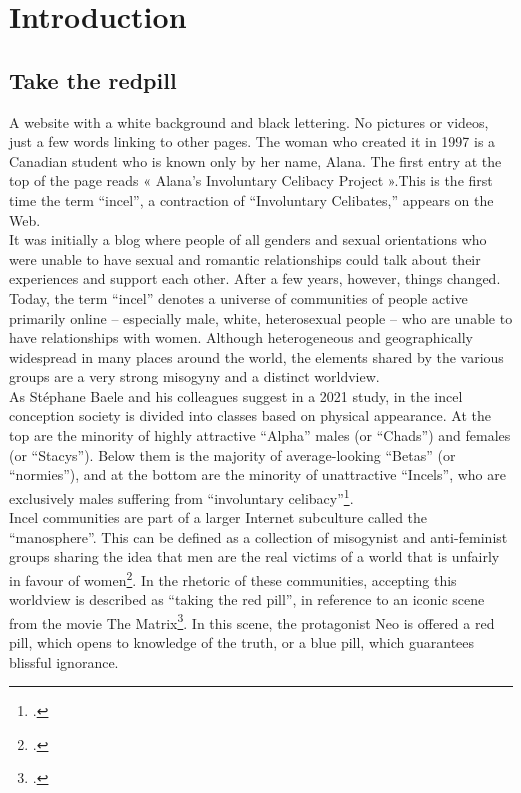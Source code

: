 \documentclass[a4paper,twoside,12pt, openany]{book}
\begin{document}
\mainmatter


\chapter{Introduction}

\section{Take the redpill}
A website with a white background and black lettering. No pictures or videos, just a few words linking to other pages. The woman who created it in 1997 is a Canadian student who is known only by her name, Alana. The first entry at the top of the page reads « Alana's Involuntary Celibacy Project ».This is the first time the term \enquote{incel}, a contraction of “Involuntary Celibates,” appears on the Web.\\
It was initially a blog where people of all genders and sexual orientations who were unable to have sexual and romantic relationships could talk about their experiences and support each other. After a few years, however, things changed.\\

Today, the term \enquote{incel} denotes a universe of communities of people active primarily online  – especially male, white, heterosexual people – who are unable to have relationships with women. Although heterogeneous and geographically widespread in many places around the world, the elements shared by the various groups are a very strong misogyny and a distinct worldview.
\\
As Stéphane Baele and his colleagues suggest in a 2021 study, in the incel conception society is divided into classes based on physical appearance. At the top are the minority of highly attractive “Alpha” males (or “Chads”) and females (or “Stacys”). Below them is the majority of average-looking “Betas” (or “normies”), and at the bottom are the minority of unattractive “Incels”, who are exclusively males suffering from “involuntary celibacy”\footcite{baele2021}.\\
Incel communities are part of a larger Internet subculture called the “manosphere”. This can be defined as a collection of misogynist and anti-feminist groups sharing the idea that men are the real victims of a world that is unfairly in favour of
women\footcite{sugiura2021}. In the rhetoric of these communities, accepting this worldview is described as “taking the red pill”, in reference to an iconic scene from the movie The Matrix\footcite{vanvalkenburgh2021}. In this scene, the protagonist Neo is offered a red pill, which opens to knowledge of the truth, or a blue pill, which guarantees blissful ignorance.
\end{document}
